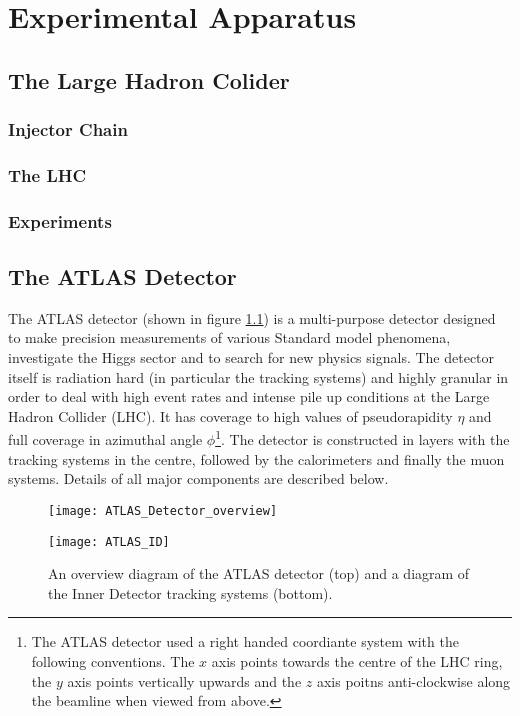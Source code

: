 \chapter{Experimental Apparatus}

\section{The Large Hadron Colider}
\subsection{Injector Chain}
\subsection{The LHC}
\subsection{Experiments}

\section{The ATLAS Detector}

The ATLAS detector (shown in figure \ref{fig:ATLAS_overview}) is a multi-purpose detector designed to make precision measurements of various Standard model phenomena, investigate the Higgs sector and to search for new physics signals. The detector itself is radiation hard (in particular the tracking systems) and highly granular in order to deal with high event rates and intense pile up conditions at the Large Hadron Collider (LHC). It has coverage to high values of pseudorapidity $\eta$ and full coverage in azimuthal angle $\phi$\footnote{The ATLAS detector used a right handed coordiante system with the following conventions. The $x$ axis points towards the centre of the LHC ring, the $y$ axis points vertically upwards and the $z$ axis poitns anti-clockwise along the beamline when viewed from above.}. The detector is constructed in layers with the tracking systems in the centre, followed by the calorimeters and finally the muon systems. Details of all major components are described below.

\begin{figure}
  \begin{center}
    \texttt{[image: ATLAS\_Detector\_overview]}

    \texttt{[image: ATLAS\_ID]}
  \end{center}
  \caption{An overview diagram of the ATLAS detector (top) and a diagram of the Inner Detector tracking systems (bottom).}
  \label{fig:ATLAS_overview}
\end{figure}

